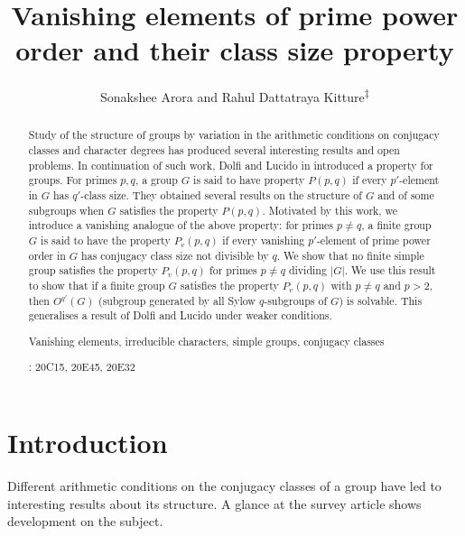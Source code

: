 \documentclass[11pt, a4paper]{article}
\title{Vanishing elements of prime power order and their class size property}
\author{Sonakshee Arora\textsuperscript{\textdagger} and Rahul Dattatraya Kitture\textsuperscript{$\ddagger$}}
\date{}
\numberwithin{equation}{section}
\theoremstyle{plain} %
\begin{document}
\maketitle 

\begin{abstract} Study of the structure of groups by variation in the arithmetic conditions on conjugacy classes and character degrees has produced several interesting results and open problems. In continuation of such work, Dolfi and Lucido in \cite{MR1826493} introduced a property for groups. For primes $p,q$, a group $G$ is said to have property $P(p,q)$ if every $p'$-element in $G$ has $q'$-class size. They obtained several results on the structure of $G$ and of some subgroups when $G$ satisfies the property $P(p,q)$. Motivated by this work, we introduce a vanishing analogue of the above property: for primes $p \neq q$, a finite group $G$ is said to have the property $P_v(p,q)$ if every vanishing $p'$-element of prime power order in $G$ has conjugacy class size not divisible by $q$. We show that no finite simple group satisfies the property $P_v(p,q)$ for primes $p\neq q$ dividing $|G|$. We use this result to show that if a finite group $G$ satisfies the property $P_v(p,q)$ with $p \neq q$ and $p > 2$, then $O^{q'}(G)$ (subgroup generated by all Sylow $q$-subgroups of $G$) is solvable. This generalises a result of Dolfi and Lucido under weaker conditions. 



\vskip3mm
 Vanishing elements, irreducible characters, simple groups, conjugacy classes
		
: 20C15, 20E45, 20E32
\end{abstract}
\section{Introduction}
\noindent 
Different arithmetic conditions on the conjugacy classes of a group have led to interesting results about its structure. A glance at the survey article \cite{MR2875589} shows development on the subject. 
\end{document}
